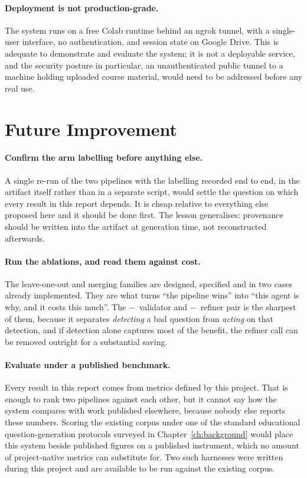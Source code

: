 \paragraph{Deployment is not production-grade.} The system runs on a free Colab
runtime behind an ngrok tunnel, with a single-user interface, no authentication, and
session state on Google Drive. This is adequate to demonstrate and evaluate the
system; it is not a deployable service, and the security posture in particular,
an unauthenticated public tunnel to a machine holding uploaded course material,
would need to be addressed before any real use.

\section{Future Improvement}
\label{sec:concl-future}

\paragraph{Confirm the arm labelling before anything else.} A single re-run of the
two pipelines with the labelling recorded end to end, in the artifact itself rather
than in a separate script, would settle the question on which every result in this
report depends. It is cheap relative to everything else proposed here and it should
be done first. The lesson generalises: provenance should be written into the
artifact at generation time, not reconstructed afterwards.

\paragraph{Run the ablations, and read them against cost.} The leave-one-out and
merging families are designed, specified and in two cases already implemented. They
are what turns ``the pipeline wins'' into ``this agent is why, and it costs this
much''. The $-$\, validator and $-$\, refiner pair is the sharpest of them, because it
separates \emph{detecting} a bad question from \emph{acting} on that detection,
and if detection alone captures most of the benefit, the refiner call can be removed
outright for a substantial saving.

\paragraph{Evaluate under a published benchmark.} Every result in this report
comes from metrics defined by this project. That is enough to rank two pipelines
against each other, but it cannot say how the system compares with work published
elsewhere, because nobody else reports these numbers. Scoring the existing corpus
under one of the standard educational question-generation protocols surveyed in
Chapter~\ref{ch:background} would place this system beside published figures on a
published instrument, which no amount of project-native metrics can substitute
for. Two such harnesses were written during this project and are available to be
run against the existing corpus.

